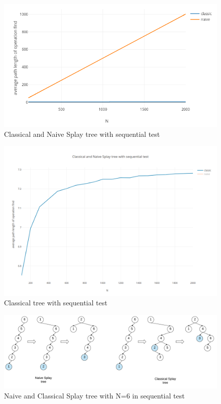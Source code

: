 \documentclass{article}
\begin{document}
\begin{figure}[h!]
\centering
\includegraphics[width=\textwidth]{NTIN066-plot4.png}
\caption{Classical and Naive Splay tree with sequential test}
\label{fig:plot4}
\end{figure}
\begin{figure}[h!]
\centering
\includegraphics[width=\textwidth]{NTIN066-plot4a.png}
\caption{Classical tree with sequential test}
\label{fig:plot4a}
\end{figure}
\begin{figure}[h!]
\centering
\includegraphics[width=\textwidth]{naive-seq.png}
\caption{Naive and Classical Splay tree with N=6 in sequential test}
\label{fig:naive-seq}
\end{figure}
\end{document}
